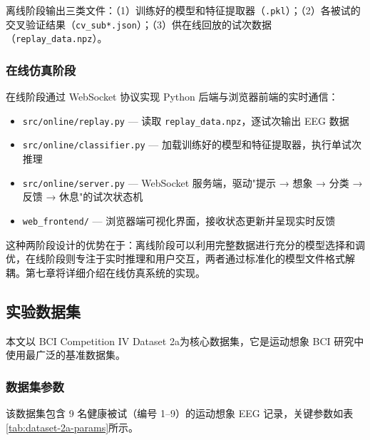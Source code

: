 离线阶段输出三类文件：（1）训练好的模型和特征提取器（\texttt{.pkl}）；（2）各被试的交叉验证结果（\texttt{cv\_sub*.json}）；（3）供在线回放的试次数据（\texttt{replay\_data.npz}）。

\subsubsection{在线仿真阶段}

在线阶段通过 WebSocket 协议实现 Python 后端与浏览器前端的实时通信：

\begin{itemize}[leftmargin=2em]
	\item \texttt{src/online/replay.py} — 读取 \texttt{replay\_data.npz}，逐试次输出 EEG 数据
	\item \texttt{src/online/classifier.py} — 加载训练好的模型和特征提取器，执行单试次推理
	\item \texttt{src/online/server.py} — WebSocket 服务端，驱动"提示 → 想象 → 分类 → 反馈 → 休息"的试次状态机
	\item \texttt{web\_frontend/} — 浏览器端可视化界面，接收状态更新并呈现实时反馈
\end{itemize}

这种两阶段设计的优势在于：离线阶段可以利用完整数据进行充分的模型选择和调优，在线阶段则专注于实时推理和用户交互，两者通过标准化的模型文件格式解耦。第七章将详细介绍在线仿真系统的实现。

\subsection{实验数据集}
\label{sec:dataset-design}

本文以 BCI Competition IV Dataset 2a为核心数据集，它是运动想象 BCI 研究中使用最广泛的基准数据集。

\subsubsection{数据集参数}

该数据集包含 9 名健康被试（编号 1--9）的运动想象 EEG 记录，关键参数如表\ref{tab:dataset-2a-params}所示。


